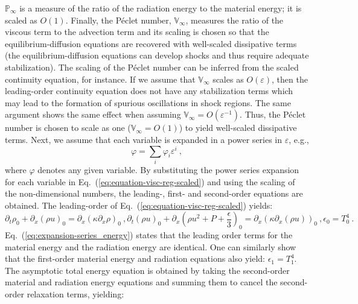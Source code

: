 \documentclass[review]{elsarticle}
\newcommand{\eqt}[1]{Eq.~(\ref{#1})}                     %
\renewcommand{\Re}{\textrm{Re}}
\newcommand{\Pe}{\textrm{P\'e}}
\renewcommand{\Re}{\mathbb{P}_\infty}
\renewcommand{\Pe}{\mathbb{V}_\infty}
\begin{document}
%
$\Re$ is a measure of the ratio of the radiation energy to the material energy; it is scaled as $O(1)$. 
%
Finally, the P\'eclet number, $\Pe$, measures the ratio of the viscous term to the advection term and its scaling is chosen so that the equilibrium-diffusion equations are recovered with well-scaled dissipative terms (the equilibrium-diffusion equations can develop shocks and thus require adequate stabilization). The scaling of the P\'eclet number can be inferred from the scaled continuity equation, for instance. If we assume that $\Pe$ scales as $O(\varepsilon)$, then the leading-order continuity equation does not have any stabilization terms which may lead to the formation of spurious oscillations in shock regions. The same argument shows the same effect when assuming $\Pe = O(\varepsilon^{-1})$. Thus, the P\'eclet number is chosen to scale as one ($\Pe = O(1)$) to yield well-scaled dissipative terms. 
%
Next, we assume that each variable is expanded in a power series in $\varepsilon$, e.g.,
%
\begin{equation}\label{eq:expansion-series}
\varphi = \sum_i \varphi_i \varepsilon^i \ ,
\end{equation}
%
where $\varphi$ denotes any given variable. By substituting the power series expansion for each variable in \eqt{eq:equation-visc-reg-scaled} and using the scaling of the non-dimensional numbers, the leading-, first- and second-order equations are obtained. The leading-order of \eqt{eq:equation-visc-reg-scaled} yields:
%
\begin{subequations}
\label{eq:first-order}
%
\begin{equation}
\partial_t \rho_0 + \partial_x \left( \rho u \right)_0 = \partial_x \left( \kappa \partial_x  \rho \right)_0  \ ,
\end{equation}
%
\begin{equation}
\partial_t \left( \rho u \right)_0 + \partial_x \left( \rho u^2 + P + \frac{\epsilon}{3}\right)_0 = \partial_x \left( \kappa \partial_x \left( \rho u \right) \right)_0  \ ,
\end{equation}
%
\begin{equation}\label{eq:expansion-series_energy}
\epsilon_0 = T_0^4  \ .
\end{equation}
%
\end{subequations}
%
%
\eqt{eq:expansion-series_energy} states that the leading order terms for the material energy and the radiation energy are identical. One can similarly show that the first-order material energy and radiation equations also yield: $\epsilon_1 = T_1^4$. The asymptotic total energy equation is obtained by taking the second-order material and radiation energy equations and summing them to cancel the second-order relaxation terms, yielding:
\end{document}
